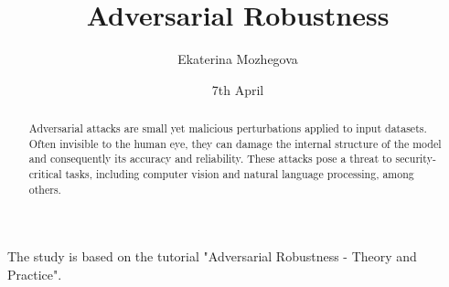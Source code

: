 \documentclass{article}
\title{Adversarial Robustness}
\author{Ekaterina Mozhegova}
\date{7th April}
\begin{document}
\maketitle

The study is based on the tutorial "Adversarial Robustness - Theory and Practice".

\begin{abstract}


  Adversarial attacks are small yet malicious perturbations applied to input datasets. Often invisible to the human eye, they can damage the internal structure of the model and 
  consequently its accuracy and reliability. These attacks pose a threat to security-critical tasks, including computer vision and natural language processing, among others.
\end{abstract}

\tableofcontents
\newpage




\end{document}
